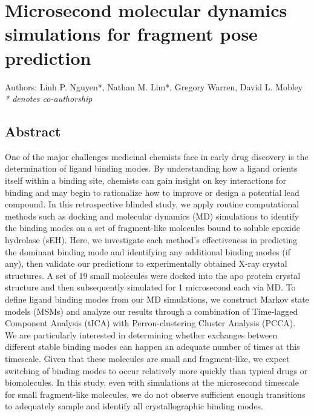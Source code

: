 \chapter{Microsecond molecular dynamics simulations for fragment pose prediction} \label{SEH-MD}

\small{Authors: Linh P. Nguyen*, Nathan M. Lim*, Gregory Warren, David L. Mobley}\\
\small{\textit{* denotes co-authorship}}

\section*{Abstract}
One of the major challenges medicinal chemists face in early drug discovery is the determination of ligand binding modes.
By understanding how a ligand orients itself within a binding site, chemists can gain insight on key interactions for binding and may begin to rationalize how to improve or design a potential lead compound. 
In this retrospective blinded study, we apply routine computational methods such as docking and molecular dynamics (MD) simulations to identify the binding modes on a set of fragment-like molecules bound to soluble epoxide hydrolase (sEH).
Here, we investigate each method's effectiveness in predicting the dominant binding mode and identifying any additional binding modes (if any), then validate our predictions to experimentally obtained X-ray crystal structures.
A set of 19 small molecules were docked into the apo protein crystal structure and then subsequently simulated for 1 microsecond each via MD.
To define ligand binding modes from our MD simulations, we construct Markov state models (MSMs) and analyze our results through a combination of Time-lagged Component Analysis (tICA) with Perron-clustering Cluster Analysis (PCCA).
We are particularly interested in determining whether exchanges between different stable binding modes can happen an adequate number of times at this timescale.
Given that these molecules are small and fragment-like, we expect switching of binding modes to occur relatively more quickly than typical drugs or biomolecules.
In this study, even with simulations at the microsecond timescale for small fragment-like molecules, we do not observe sufficient enough transitions to adequately sample and identify all crystallographic binding modes. 


